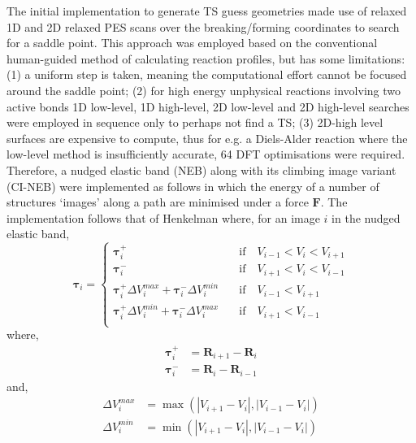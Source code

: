 \documentclass[../../main.tex]{subfiles}
\begin{document}
The initial \ade implementation to generate TS guess geometries made use of relaxed 1D and 2D relaxed PES scans over the breaking/forming coordinates to search for a saddle point. This approach was employed based on the conventional human-guided method of calculating reaction profiles, but has some limitations: (1) a uniform step is taken, meaning the computational effort cannot be focused around the saddle point; (2) for high energy unphysical reactions involving two active bonds 1D low-level, 1D high-level, 2D low-level and 2D high-level searches were employed in sequence only to perhaps not find a TS; (3) 2D-high level surfaces are expensive to compute, thus for e.g. a Diels-Alder reaction where the low-level method is insufficiently accurate, 64 DFT optimisations were required. Therefore, a nudged elastic band (NEB)\cite{NEB1998} along with its climbing image variant (CI-NEB)\cite{Henkelman2000CINEB} were implemented as follows in which the energy of a number of structures `images' along a path are minimised under a force $\boldsymbol{F}$. The implementation follows that of Henkelman\cite{Henkelman2000NEB} where, for an image $i$ in the nudged elastic band,
\begin{equation}
	\boldsymbol{\tau}_i = 
	\begin{cases}
		\boldsymbol{\tau}_i^+ &\quad\text{if}\quad V_{i-1} < V_i < V_{i+1} \\
		\boldsymbol{\tau}_i^- &\quad\text{if}\quad V_{i+1} < V_i < V_{i-1} \\
		\boldsymbol{\tau}_i^+\Delta V_i^{max} + \boldsymbol{\tau}_i^-\Delta V_i^{min} &\quad\text{if}\quad V_{i-1} <  V_{i+1} \\
		\boldsymbol{\tau}_i^+\Delta V_i^{min} + \boldsymbol{\tau}_i^-\Delta V_i^{max} &\quad\text{if}\quad V_{i+1} < V_{i-1} \\
	\end{cases}
\end{equation}
where,
\begin{equation}
	\begin{aligned}
		\boldsymbol{\tau}_i^+ &= \boldsymbol{R}_{i+1} - \boldsymbol{R}_i \\
		\boldsymbol{\tau}_i^- &= \boldsymbol{R}_{i} - \boldsymbol{R}_{i-1}
	\end{aligned}
\end{equation}
and,
\begin{equation}
	\begin{aligned}
		\Delta V_i^{max} &= \max(|V_{i+1} - V_i|, |V_{i-1} - V_i|) \\
		\Delta V_i^{min} &= \min(|V_{i+1} - V_i|, |V_{i-1} - V_i|)
	\end{aligned}
\end{equation}
\end{document}

